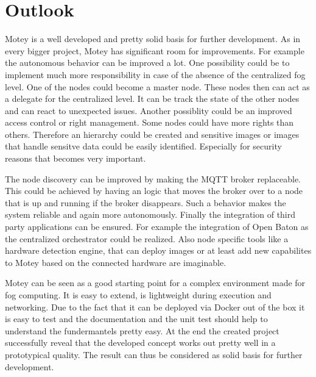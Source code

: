 




\section{Outlook}
Motey is a well developed and pretty solid basis for further development.
As in every bigger project, Motey has significant room for improvements.
For example the autonomous behavior can be improved a lot.
One possibility could be to implement much more responsibility in case of the absence of the centralized fog level.
One of the nodes could become a master node.
These nodes then can act as a delegate for the centralized level.
It can be track the state of the other nodes and can react to unexpected issues.
Another possiblity could be an improved access control or right management.
Some nodes could have more rights than others.
Therefore an hierarchy could be created and sensitive images or images that handle sensitve data could be easily identified.
Especially for security reasons that becomes very important.\newline

The node discovery can be improved by making the \ac{MQTT} broker replaceable.
This could be achieved by having an logic that moves the broker over to a node that is up and running if the broker disappears.
Such a behavior makes the system reliable and again more autonomously.
Finally the integration of third party applications can be ensured.
For example the integration of Open Baton as the centralized orchestrator could be realized.
Also node specific tools like a hardware detection engine, that can deploy images or at least add new capabilites to Motey based on the connected hardware are imaginable.\newline

Motey can be seen as a good starting point for a complex environment made for fog computing.
It is easy to extend, is lightweight during execution and networking.
Due to the fact that it can be deployed via Docker out of the box it is easy to test and the documentation and the unit test should help to understand the fundermantels pretty easy.
At the end the created project successfully reveal that the developed concept works out pretty well in a prototypical quality.
The result can thus be considered as solid basis for further development.
